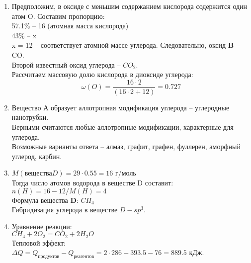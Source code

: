 \solutionSection
\begin{enumerate}
\item Предположим, в оксиде с меньшим содержанием кислорода содержится один атом O. Составим пропорцию:\\
57.1\% – 16 (атомная масса кислорода)\\
43\% – x\\
x = 12 – соответствует атомной массе углерода. Следовательно, оксид \textbf{B} – CO.\\
Второй известный оксид углерода – $CO_2$.\\
Рассчитаем массовую долю кислорода в диоксиде углерода:\\
$$\omega(O) = \frac{16\cdot2}{(16\cdot2+12)} = 0.727$$
\item Вещество А образует аллотропная модификация углерода – углеродные нанотрубки.\\
Верными считаются любые аллотропные модификации, характерные для углерода.\\
Возможные варианты ответа – алмаз, графит, графен, фуллерен, аморфный углерод, карбин.
\item $M(\text{вещества} D) = 29\cdot0.55 = 16$ г/моль\\
Тогда число атомов водорода в веществе D составит:\\
$n(H) = 16-12/M(H) = 4$\\
Формула вещества \textbf{D}: $CH_4$\\
Гибридизация углерода в веществе $D - sp^3$.
\item Уравнение реакции:\\
$CH_4 + 2O_2 = CO_2 + 2H_2O$\\
Тепловой эффект:\\
$\Delta Q = Q_\text{продуктов} - Q_\text{реагентов} = 2\cdot286 + 393.5 - 76 = 889.5$ кДж.
\end{enumerate}